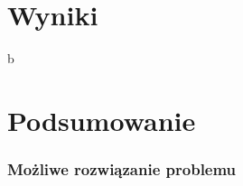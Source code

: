 \documentclass[10pt]{beamer}
\begin{document}
\section{Wyniki}

\begin{frame}
b
\end{frame}

\section{Podsumowanie}

\begin{frame}
  \frametitle{Możliwe rozwiązanie problemu}
\end{frame}
\end{document}
